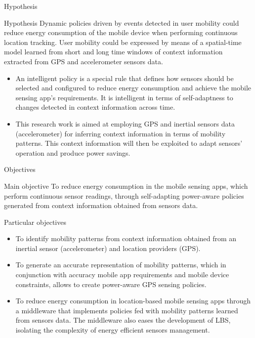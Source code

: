 \documentclass[8pt,xcolor={dvipsnames},handout]{beamer}
\begin{document}
\begin{frame}{Hypothesis}
\begin{exampleblock}{Hypothesis}
Dynamic policies driven by events detected in user mobility could reduce energy consumption of the mobile device when performing continuous location tracking.
User mobility could be expressed by means of a spatial-time model learned from short and long time windows of context information extracted from GPS and accelerometer sensors data.
\end{exampleblock}
{
\pause
\begin{itemize}
  \item An intelligent policy is a special rule that defines how sensors should be selected and configured to reduce energy consumption and achieve the mobile sensing app's requirements.
  It is intelligent in terms of self-adaptness to changes detected in context information across time.
  \pause
  \item This research work is aimed at employing GPS and inertial sensors data (accelerometer) for inferring context information in terms of mobility patterns.
  This context information will then be exploited to adapt sensors' operation and produce power savings.
\end{itemize}
}
\end{frame}

\begin{frame}{Objectives}
\begin{exampleblock}{Main objective}
To reduce energy consumption in the mobile sensing apps, which perform continuous sensor readings, through self-adapting power-aware policies generated from context information obtained from sensors data.
\end{exampleblock}
\pause

\begin{exampleblock}{Particular objectives}
\begin{itemize}
  \item To identify mobility patterns from context information obtained from an inertial sensor (accelerometer) and location providers (GPS).
  \pause
  \item To generate an accurate representation of mobility patterns, which in conjunction with accuracy mobile app requirements and mobile device constraints, allows to create power-aware GPS sensing policies.
  \pause
  \item To reduce energy consumption in location-based mobile sensing apps through a middleware that implements policies fed with mobility patterns learned from sensors data. 
  The middleware also eases the development of LBS, isolating the complexity of energy efficient sensors management.
\end{itemize}
\end{exampleblock}
\end{frame}
\end{document}
